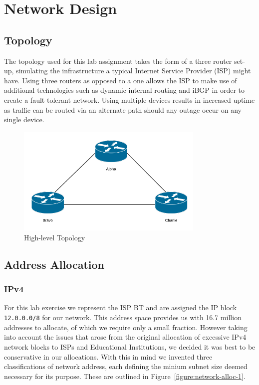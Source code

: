 \chapter{Network Design}

\section{Topology}

The topology used for this lab assignment takes the form of a three router set-
up, simulating the infrastructure a typical Internet Service Provider (ISP)
might have. Using three routers as opposed to a one allows the ISP to make use
of additional technologies such as dynamic internal routing and iBGP in order
to create a fault-tolerant network. Using multiple devices results in increased
uptime as traffic can be routed via an alternate path should any outage occur
on any single device.

\begin{figure}[!ht]
    \caption{High-level Topology}
    \centering
    \includegraphics[width=0.8\textwidth]{images/networkTopology.png}
\end{figure}

\section{Address Allocation}
\subsection{IPv4}
For this lab exercise we represent the ISP BT and are assigned the IP block
\texttt{12.0.0.0/8} for our network. This address space provides us with 16.7
million addresses to allocate, of which we require only a small fraction.
However taking into account the issues that arose from the original allocation
of excessive IPv4 network blocks to ISPs and Educational Institutions, we
decided it was best to be conservative in our allocations. With this in mind we
invented three classifications of network address, each defining the minium
subnet size deemed necessary for its purpose. These are outlined in
Figure~\ref{figure:network-alloc-1}.

